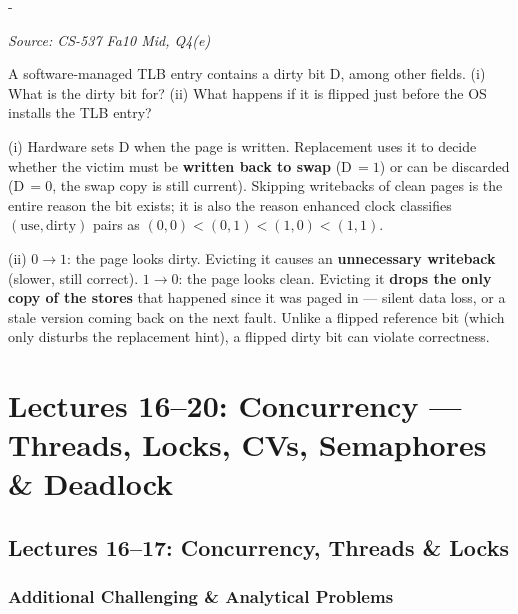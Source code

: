 \documentclass[11pt,a4paper]{article}
\makeatletter
\newcommand{\keepspace}[1]{\par\penalty-100\begingroup
  \setlength{\dimen@}{#1}\dimen@ii\pagegoal\advance\dimen@ii-\pagetotal
  \ifdim\dimen@>\dimen@ii\ifdim\dimen@ii>\z@\vfil\fi\break\fi\endgroup}
\newcounter{qn}[section]
\newenvironment{Qn}[4]{%
  \refstepcounter{qn}\keepspace{7\baselineskip}%
  \begin{tcolorbox}[qboxstyle, title={Q\thesection.\theqn\ \ [#1 \textbar\ #2]\ \ #4}]%
  {\footnotesize\color{g3}\textit{Source: #3}}\par\smallskip%
}{%
  \end{tcolorbox}%
}
\newenvironment{Sol}{%
  \begin{tcolorbox}[sboxstyle, title={Solution}]%
}{%
  \end{tcolorbox}\vspace{0.35em}%
}
\makeatother
\begin{document}
\begin{Qn}{Medium}{Lect 15}{CS-537 Fa10 Mid, Q4(e)}{The dirty bit: purpose, and what a flipped dirty bit does}
A software-managed TLB entry contains a dirty bit D, among other
fields. (i) What is the dirty bit for? (ii) What happens if it is
flipped just before the OS installs the TLB entry?
\end{Qn}
\begin{Sol}
(i) Hardware sets D when the page is written. Replacement uses it to
decide whether the victim must be \textbf{written back to swap}
(D$\,=1$) or can be discarded (D$\,=0$, the swap copy is still
current). Skipping writebacks of clean pages is the entire reason the
bit exists; it is also the reason enhanced clock classifies
$(\mathrm{use},\mathrm{dirty})$ pairs as
$(0,0)<(0,1)<(1,0)<(1,1)$.

(ii) $0\to 1$: the page looks dirty. Evicting it causes an
\textbf{unnecessary writeback} (slower, still correct). $1\to 0$: the
page looks clean. Evicting it \textbf{drops the only copy of the
stores} that happened since it was paged in --- silent data loss, or
a stale version coming back on the next fault. Unlike a flipped
reference bit (which only disturbs the replacement hint), a flipped
dirty bit can violate correctness.
\end{Sol}

\clearpage

\section{Lectures 16--20: Concurrency --- Threads, Locks, CVs, Semaphores \& Deadlock}

\subsection{Lectures 16--17: Concurrency, Threads \& Locks}

\subsubsection*{Additional Challenging \& Analytical Problems}
\end{document}
